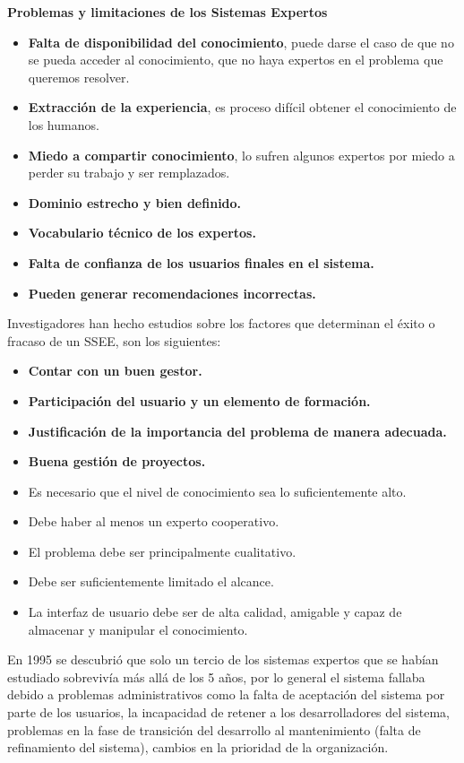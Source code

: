 \documentclass[12pt, twoside, openright]{report} %
\begin{document}
\textbf{Problemas y limitaciones de los Sistemas Expertos}
\begin{itemize}
	\item \textbf{Falta de disponibilidad del conocimiento}, puede darse el caso de que no se pueda acceder al conocimiento, que no haya expertos en el problema que queremos resolver.
	\item \textbf{Extracción de la experiencia}, es proceso difícil obtener el conocimiento de los humanos.
	\item \textbf{Miedo a compartir conocimiento}, lo sufren algunos expertos por miedo a perder su trabajo y ser remplazados.
	\item \textbf{Dominio estrecho y bien definido.}
	\item \textbf{Vocabulario técnico de los expertos.}
	\item \textbf{Falta de confianza de los usuarios finales en el sistema.}
	\item \textbf{Pueden generar recomendaciones incorrectas.}
\end{itemize}

Investigadores han hecho estudios sobre los factores que determinan el éxito o fracaso de un SSEE, son los siguientes:
\begin{itemize}
	\item \textbf{Contar con un buen gestor.}
	\item \textbf{Participación del usuario y un elemento de formación.}
	\item \textbf{Justificación de la importancia del problema de manera adecuada.}
	\item \textbf{Buena gestión de proyectos.}
	\item Es necesario que el nivel de conocimiento sea lo suficientemente alto.
	\item Debe haber al menos un experto cooperativo.
	\item El problema debe ser principalmente cualitativo.
	\item Debe ser suficientemente limitado el alcance.
	\item La interfaz de usuario debe ser de alta calidad, amigable y capaz de almacenar y manipular el conocimiento.
\end{itemize}

En 1995 se descubrió que solo un tercio de los sistemas expertos que se habían estudiado sobrevivía más allá de los 5 años, por lo general el sistema fallaba debido a problemas administrativos como la falta de aceptación del sistema por parte de los usuarios, la incapacidad de retener a los desarrolladores del sistema, problemas en la fase de transición del desarrollo al mantenimiento (falta de refinamiento del sistema), cambios en la prioridad de la organización.
\end{document}
